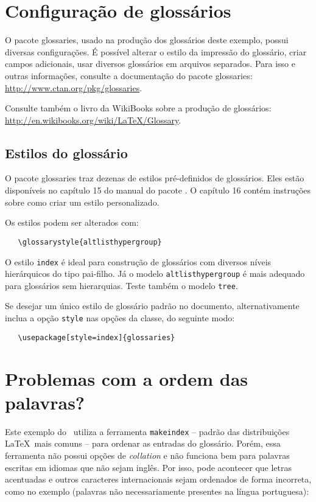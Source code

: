 \documentclass[12pt,openright,twoside,a4paper,brazil]{abntex2}
\begin{document}
\section{Configuração de glossários}

O pacote \textsf{glossaries}, usado na produção dos glossários deste exemplo,
possui diversas configurações. É possível alterar o estilo da impressão do
glossário, criar campos adicionais, usar diversos glossários em
arquivos separados. Para isso e outras informações, consulte a documentação do
pacote \textsf{glossaries}: \url{http://www.ctan.org/pkg/glossaries}.

Consulte também o livro da WikiBooks sobre a produção de glossários:
\url{http://en.wikibooks.org/wiki/LaTeX/Glossary}.
 

\subsection{Estilos do glossário}

O pacote \textsf{glossaries} traz dezenas de estilos pré-definidos de
glossários. Eles estão disponíveis no capítulo 15 do manual do pacote
\cite{talbot2012}. O capítulo 16 contém instruções sobre como criar um estilo
personalizado.

Os estilos podem ser alterados com:

\begin{verbatim}
   \glossarystyle{altlisthypergroup}
\end{verbatim}

O estilo \texttt{index} é ideal para construção de glossários com diversos
níveis hierárquicos do tipo pai-filho. Já o modelo \texttt{altlisthypergroup} é
mais adequado para glossários sem hierarquias. Teste também o modelo
\texttt{tree}.

Se desejar um único estilo de glossário padrão no documento, alternativamente
inclua a opção \texttt{style} nas opções da classe, do
seguinte modo:

\begin{verbatim}
   \usepackage[style=index]{glossaries}
\end{verbatim}

\section{Problemas com a ordem das palavras?}

Este exemplo do \abnTeX\ utiliza a ferramenta \texttt{makeindex} -- padrão das
distribuições \LaTeX\ mais comuns -- para ordenar as entradas do glossário.
Porém, essa ferramenta não possui opções de \textit{collation} e não funciona
bem para palavras escritas em idiomas que não sejam inglês.
Por isso, pode acontecer que letras acentuadas e outros caracteres
internacionais sejam ordenados de forma incorreta, como no exemplo (palavras não
necessariamente presentes na língua portuguesa):
\end{document}
